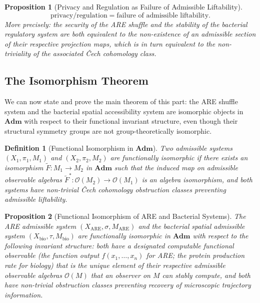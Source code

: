 \documentclass[12pt, a4paper]{article}
\theoremstyle{essaystyle}
\newtheorem{definition}{Definition}
\newtheorem{proposition}{Proposition}
\begin{document}
\begin{proposition}[Privacy and Regulation as Failure of Admissible Liftability]
\[
\text{privacy/regulation} = \text{failure of admissible liftability}.
\]
More precisely: the security of the ARE shuffle and the stability of the bacterial
regulatory system are both equivalent to the non-existence of an admissible section
of their respective projection maps, which is in turn equivalent to the non-triviality
of the associated Čech cohomology class.
\end{proposition}

\subsection{The Isomorphism Theorem}

We can now state and prove the main theorem of this part: the ARE shuffle system and
the bacterial spatial accessibility system are isomorphic objects in $\mathbf{Adm}$
with respect to their functional invariant structure, even though their structural
symmetry groups are not group-theoretically isomorphic.

\begin{definition}[Functional Isomorphism in $\mathbf{Adm}$]
Two admissible systems $(X_1, \pi_1, M_1)$ and $(X_2, \pi_2, M_2)$ are
\emph{functionally isomorphic} if there exists an isomorphism $\tilde{F} : M_1 \to M_2$
in $\mathbf{Adm}$ such that the induced map on admissible observable algebras
$\tilde{F}^* : \mathcal{O}(M_2) \to \mathcal{O}(M_1)$ is an algebra isomorphism,
and both systems have non-trivial Čech cohomology obstruction classes preventing
admissible liftability.
\end{definition}

\begin{proposition}[Functional Isomorphism of ARE and Bacterial Systems]
The ARE admissible system $(X_{\mathrm{ARE}}, \sigma, M_{\mathrm{ARE}})$ and the
bacterial spatial admissible system $(X_{\mathrm{bio}}, \tau, M_{\mathrm{bio}})$
are functionally isomorphic in $\mathbf{Adm}$ with respect to the following invariant
structure: both have a designated computable functional observable (the function output
$f(x_1, \ldots, x_n)$ for ARE; the protein production rate for biology) that is the
unique element of their respective admissible observable algebras $\mathcal{O}(M)$
that an observer on $M$ can stably compute, and both have non-trivial obstruction
classes preventing recovery of microscopic trajectory information.
\end{proposition}
\end{document}
